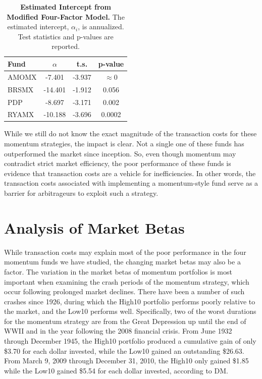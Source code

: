 \documentclass[12pt]{article}
\begin{document}
\begin{table}[h]
\centering
\caption{\textbf{Estimated Intercept from Modified Four-Factor Model.} \footnotesize{The estimated intercept, $\alpha_{i}$, is annualized. Test statistics and p-values are reported.}}
\begin{tabular}{l | c | c | c}
\hline
Fund & $\alpha$ & t.s. & p-value \\
\hline
AMOMX & -7.401 & -3.937 & $\approx 0$ \\
BRSMX & -14.401 & -1.912 & 0.056 \\ 
PDP & -8.697 & -3.171 & 0.002 \\
RYAMX & -10.188 & -3.696 & 0.0002 \\
\end{tabular}
\end{table}

While we still do not know the exact magnitude of the transaction costs for these momentum strategies, the impact is clear. Not a single one of these funds has outperformed the market since inception. So, even though momentum may contradict strict market efficiency, the poor performance of these funds is evidence that transaction costs are a vehicle for inefficiencies. In other words, the transaction costs associated with implementing a momentum-style fund serve as a barrier for arbitrageurs to exploit such a strategy.

\section{Analysis of Market Betas} %

While transaction costs may explain most of the poor performance in the four momentum funds we have studied, the changing market betas may also be a factor. The variation in the market betas of momentum portfolios is most important when examining the crash periods of the momentum strategy, which occur following prolonged market declines. There have been a number of such crashes since 1926, during which the High10 portfolio performs poorly relative to the market, and the Low10 performs well. Specifically, two of the worst durations for the momentum strategy are from the Great Depression up until the end of WWII and in the year following the 2008 financial crisis. From June 1932 through December 1945, the High10 portfolio produced a cumulative gain of only \$3.70 for each dollar invested, while the Low10 gained an outstanding \$26.63. From March 9, 2009 through December 31, 2010, the High10 only gained \$1.85 while the Low10 gained \$5.54 for each dollar invested, according to DM.
\end{document}
